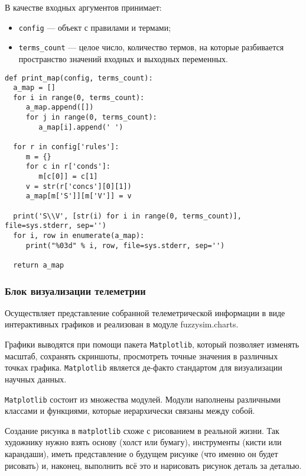 В качестве входных аргументов принимает:
\begin{itemize}
	\item \lstinline!config! — объект с правилами и термами;
	\item \lstinline!terms_count! — целое число, количество термов, на которые разбивается пространство значений входных и выходных переменных.
\end{itemize}

\begin{lstlisting}[style=pythonstyle,caption={  }, label=lst:func:1]
def print_map(config, terms_count):
  a_map = []
  for i in range(0, terms_count):
     a_map.append([])
     for j in range(0, terms_count):
        a_map[i].append(' ')

  for r in config['rules']:
     m = {}
     for c in r['conds']:
        m[c[0]] = c[1]
     v = str(r['concs'][0][1])
     a_map[m['S']][m['V']] = v

  print('S\\V', [str(i) for i in range(0, terms_count)], file=sys.stderr, sep='')
  for i, row in enumerate(a_map):
     print("%03d" % i, row, file=sys.stderr, sep='')

  return a_map
\end{lstlisting}

\subsubsection{ Блок визуализации телеметрии}


Осуществляет представление собранной телеметрической информации в виде интерактивных графиков и реализован в модуле fuzzysim.charts.

Графики выводятся при помощи пакета \lstinline!Matplotlib!, который позволяет изменять масштаб, сохранять скриншоты, просмотреть точные значения в различных точках графика.  \lstinline!Matplotlib! является де-факто стандартом для визуализации научных данных.

\lstinline!Matplotlib! состоит из множества модулей. Модули наполнены различными классами и функциями, которые иерархически связаны между собой.

Создание рисунка в \lstinline!matplotlib! схоже с рисованием в реальной жизни. Так художнику нужно взять основу (холст или бумагу), инструменты (кисти или карандаши), иметь представление о будущем рисунке (что именно он будет рисовать) и, наконец, выполнить всё это и нарисовать рисунок деталь за деталью.

